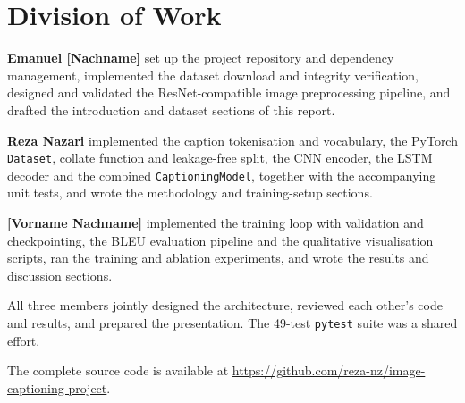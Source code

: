 \documentclass{article}
\begin{document}
\section*{Division of Work}


\textbf{Emanuel [Nachname]} set up the project repository and dependency
management, implemented the dataset download and integrity verification, designed
and validated the ResNet-compatible image preprocessing pipeline, and drafted the
introduction and dataset sections of this report.

\textbf{Reza Nazari} implemented the caption tokenisation and vocabulary, the
PyTorch \texttt{Dataset}, collate function and leakage-free split, the CNN
encoder, the LSTM decoder and the combined \texttt{CaptioningModel}, together
with the accompanying unit tests, and wrote the methodology and training-setup
sections.

\textbf{[Vorname Nachname]} implemented the training loop with validation and
checkpointing, the BLEU evaluation pipeline and the qualitative visualisation
scripts, ran the training and ablation experiments, and wrote the results and
discussion sections.

All three members jointly designed the architecture, reviewed each other's code
and results, and prepared the presentation. The 49-test \texttt{pytest} suite was
a shared effort.

\medskip
\noindent
The complete source code is available at
\url{https://github.com/reza-nz/image-captioning-project}.
\end{document}
